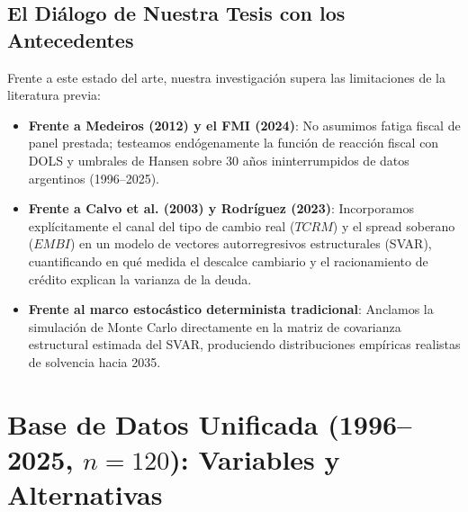 \documentclass[11pt,a4paper]{article}
\begin{document}
\subsection{El Diálogo de Nuestra Tesis con los Antecedentes}
Frente a este estado del arte, nuestra investigación supera las limitaciones de la literatura previa:
\begin{itemize}[leftmargin=1.5em]
    \item \textbf{Frente a Medeiros (2012) y el FMI (2024)}: No asumimos fatiga fiscal de panel prestada; testeamos endógenamente la función de reacción fiscal con DOLS y umbrales de Hansen sobre 30 años ininterrumpidos de datos argentinos (1996--2025).
    \item \textbf{Frente a Calvo et al. (2003) y Rodríguez (2023)}: Incorporamos explícitamente el canal del tipo de cambio real ($TCRM$) y el spread soberano ($EMBI$) en un modelo de vectores autorregresivos estructurales (SVAR), cuantificando en qué medida el descalce cambiario y el racionamiento de crédito explican la varianza de la deuda.
    \item \textbf{Frente al marco estocástico determinista tradicional}: Anclamos la simulación de Monte Carlo directamente en la matriz de covarianza estructural estimada del SVAR, produciendo distribuciones empíricas realistas de solvencia hacia 2035.
\end{itemize}

\vspace{1em}

\section{Base de Datos Unificada (1996--2025, $n=120$): Variables y Alternativas}
\end{document}
